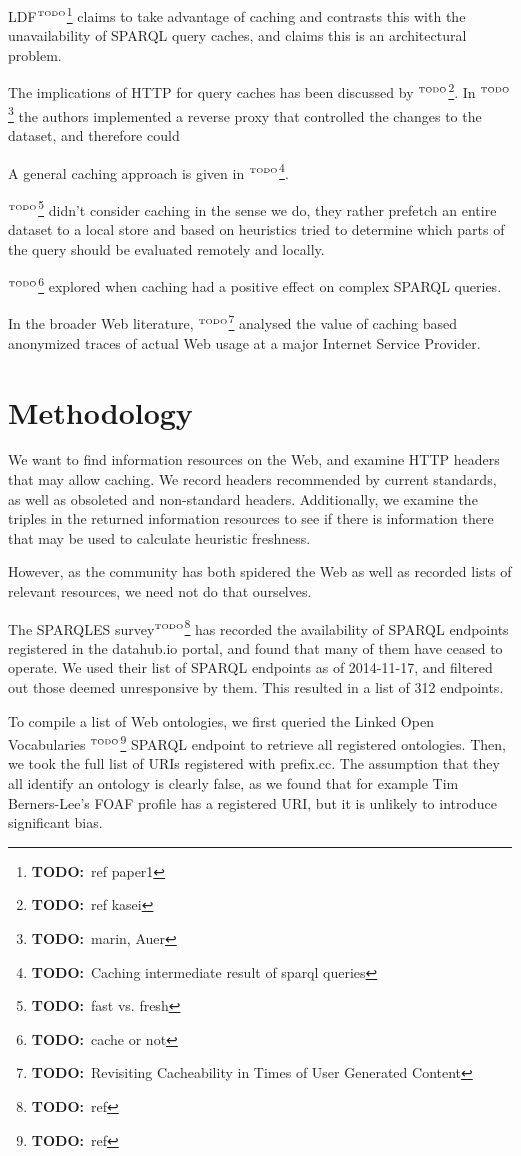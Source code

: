 \documentclass{article}
\newcommand{\todo}[1]{\ensuremath{^{\textrm{\tiny{TODO}\normalsize}}}\footnote{\textbf{TODO:}~#1}}
\begin{document}
LDF\todo{ref paper1} claims to take advantage of caching and contrasts
this with the unavailability of SPARQL query caches, and claims this is
an architectural problem.

The implications of HTTP for query caches has been discussed by
\todo{ref kasei}. In \todo{marin, Auer} the authors implemented a
reverse proxy that controlled the changes to the dataset, and
therefore could 

A general caching approach is given in \todo{Caching intermediate
  result of sparql queries}. 

\todo{fast vs. fresh} didn't consider caching in the sense we do, they
rather prefetch an entire dataset to a local store and based on
heuristics tried to determine which parts of the query should be
evaluated remotely and locally.

\todo{cache or not} explored when caching had a positive effect on
complex SPARQL queries.

In the broader Web literature, \todo{Revisiting Cacheability
in Times of User Generated Content} analysed the value of caching
based anonymized traces of actual Web usage at a major Internet
Service Provider.

\section{Methodology}

We want to find information resources on the Web, and examine HTTP
headers that may allow caching. We record headers recommended by
current standards, as well as obsoleted and non-standard
headers. Additionally, we examine the triples in the returned
information resources to see if there is information there that may be
used to calculate heuristic freshness.

However, as the community has both spidered the Web as well as
recorded lists of relevant resources, we need not do that ourselves. 

The SPARQLES survey\todo{ref} has recorded the availability of SPARQL
endpoints registered in the datahub.io portal, and found that many of
them have ceased to operate. We used their list of SPARQL endpoints as
of 2014-11-17, and filtered out those deemed unresponsive by
them. This resulted in a list of 312 endpoints.

To compile a list of Web ontologies, we first queried the Linked Open
Vocabularies \todo{ref} SPARQL endpoint to retrieve all registered
ontologies. Then, we took the full list of URIs registered with
prefix.cc. The assumption that they all identify an ontology is
clearly false, as we found that for example Tim Berners-Lee's FOAF
profile has a registered URI, but it is unlikely to introduce
significant bias.
\end{document}
